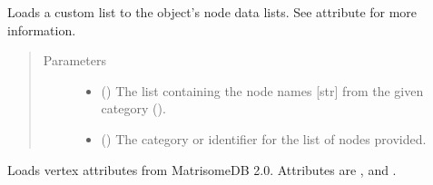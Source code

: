 \documentclass[letterpaper,10pt,english]{sphinxmanual}
\begin{document}
\begin{fulllineitems}
\begin{fulllineitems}
\label{\detokenize{main:pypath.main.PyPath.load_list}}
Loads a custom list to the object’s node data lists. See
 attribute for more
information.
\begin{quote}\begin{description}
\item[{Parameters}] \leavevmode\begin{itemize}
\item {} 
 () \textendash{} The list containing the node names {[}str{]} from the given
category ().

\item {} 
 () \textendash{} The category or identifier for the list of nodes provided.

\end{itemize}

\end{description}\end{quote}

\end{fulllineitems}


\begin{fulllineitems}
\label{\detokenize{main:pypath.main.PyPath.load_lmpid}}
\end{fulllineitems}


\begin{fulllineitems}
\label{\detokenize{main:pypath.main.PyPath.load_mappings}}
\end{fulllineitems}


\begin{fulllineitems}
\label{\detokenize{main:pypath.main.PyPath.load_matrisome_attrs}}
Loads vertex attributes from MatrisomeDB 2.0. Attributes are
,  and .


\end{fulllineitems}
\end{fulllineitems}
\end{document}
